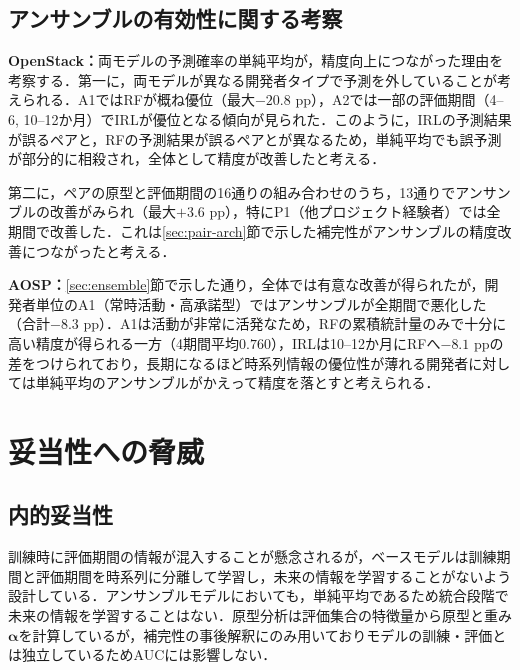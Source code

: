 \documentclass[submit]{ipsj}
\begin{document}
\vspace{-5mm}
\subsection{アンサンブルの有効性に関する考察}
\noindent\textbf{OpenStack：}両モデルの予測確率の単純平均が，精度向上につながった理由を考察する．第一に，両モデルが異なる開発者タイプで予測を外していることが考えられる．A1ではRFが概ね優位（最大$-20.8$ pp），A2では一部の評価期間（4--6, 10--12か月）でIRLが優位となる傾向が見られた．このように，IRLの予測結果が誤るペアと，RFの予測結果が誤るペアとが異なるため，単純平均でも誤予測が部分的に相殺され，全体として精度が改善したと考える．

第二に，ペアの原型と評価期間の16通りの組み合わせのうち，13通りでアンサンブルの改善がみられ（最大$+3.6$ pp），特にP1（他プロジェクト経験者）では全期間で改善した．これは\ref{sec:pair-arch}節で示した補完性がアンサンブルの精度改善につながったと考える．

\noindent\textbf{AOSP：}\ref{sec:ensemble}節で示した通り，全体では有意な改善が得られたが，開発者単位のA1（常時活動・高承諾型）ではアンサンブルが全期間で悪化した（合計$-8.3$ pp）．A1は活動が非常に活発なため，RFの累積統計量のみで十分に高い精度が得られる一方（4期間平均$0.760$），IRLは10--12か月にRFへ$-8.1$ ppの差をつけられており，長期になるほど時系列情報の優位性が薄れる開発者に対しては単純平均のアンサンブルがかえって精度を落とすと考えられる．

\section{妥当性への脅威}\label{sec:validity}

\subsection{内的妥当性}
訓練時に評価期間の情報が混入することが懸念されるが，ベースモデルは訓練期間と評価期間を時系列に分離して学習し，未来の情報を学習することがないよう設計している．アンサンブルモデルにおいても，単純平均であるため統合段階で未来の情報を学習することはない．原型分析は評価集合の特徴量から原型と重み$\bm{\alpha}$を計算しているが，補完性の事後解釈にのみ用いておりモデルの訓練・評価とは独立しているためAUCには影響しない．

\vspace{-1mm}
\end{document}
